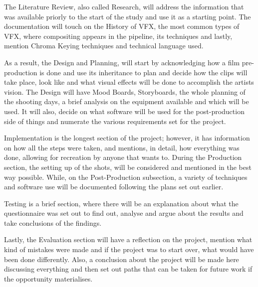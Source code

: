 \indent The Literature Review, also called Research, will address the information that was available priorly to the start of the study and use it as a starting point. The documentation will touch on the History of VFX, the most common types of VFX, where compositing appears in the pipeline, its techniques and lastly, mention Chroma Keying techniques and technical language used.

\indent As a result, the Design and Planning, will start by acknowledging how a film pre-production is done and use its inheritance to plan and decide how the clips will take place, look like and what visual effects will be done to accomplish the artists vision. The Design will have Mood Boards, Storyboards, the whole planning of the shooting days, a brief analysis on the equipment available and which will be used. It will also, decide on what software will be used for the post-production side of things and numerate the various requirements set for the project.

\indent Implementation is the longest section of the project; however, it has information on how all the steps were taken, and mentions, in detail, how everything was done, allowing for recreation by anyone that wants to. During the Production section, the setting up of the shots, will be considered and mentioned in the best way possible. While, on the Post-Production subsection, a variety of techniques and software use will be documented following the plans set out earlier.

\indent Testing is a brief section, where there will be an explanation about what the questionnaire was set out to find out, analyse and argue about the results and take conclusions of the findings.

\indent Lastly, the Evaluation section will have a reflection on the project, mention what kind of mistakes were made and if the project was to start over, what would have been done differently. Also, a conclusion about the project will be made here discussing everything and then set out paths that can be taken for future work if the opportunity materialises.

